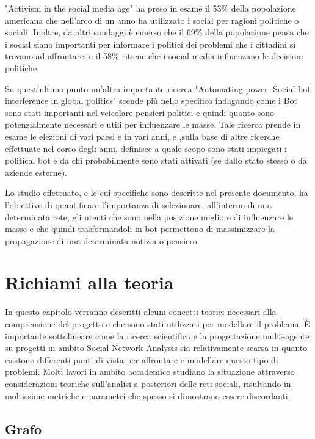 \documentclass[11pt]{article}
\begin{document}
"Activism in the social media age" \cite{ActivismSocialMedia} ha preso in esame il 53\% della popolazione americana che nell'arco di un anno ha utilizzato i social per ragioni politiche o sociali. Inoltre, da altri sondaggi è emerso che il 69\% della popolazione pensa che i social siano importanti per informare i politici dei problemi che i cittadini si trovano ad affrontare; e il 58\% ritiene che i social media influenzano le decisioni politiche.

Su quest'ultimo punto un’altra importante ricerca "Automating power: Social bot interference in global politics" \cite{AutomaticPower} scende più nello specifico indagando come i Bot sono stati importanti nel veicolare pensieri politici e quindi quanto sono potenzialmente necessari e utili per influenzare le masse. Tale ricerca prende in esame le elezioni di vari paesi e in vari anni, e ,sulla base di altre ricerche effettuate nel corso degli anni, definisce a quale scopo sono stati impiegati i political bot e da chi probabilmente sono stati attivati (se dallo stato stesso o da aziende esterne).

Lo studio effettuato, e le cui specifiche sono descritte nel presente documento, ha l’obiettivo di quantificare l’importanza di selezionare, all’interno di una determinata rete, gli utenti che sono nella posizione migliore di influenzare le masse e che quindi trasformandoli in bot permettono di massimizzare la propagazione di una determinata notizia o pensiero.


\section{Richiami alla teoria}

In questo capitolo verranno descritti alcuni concetti teorici necessari alla comprensione del progetto e che sono stati utilizzati per modellare il problema.
È importante sottolineare come la ricerca scientifica e la progettazione multi-agente su progetti in ambito Social Network Analysis sia relativamente scarsa in quanto esistono differenti punti di vista per affrontare e modellare questo tipo di problemi. Molti lavori in ambito accademico studiano la situazione attraverso considerazioni teoriche sull'analisi a posteriori delle reti sociali, risultando in moltissime metriche e parametri che spesso si dimostrano essere discordanti.

\subsection{Grafo}
\end{document}
